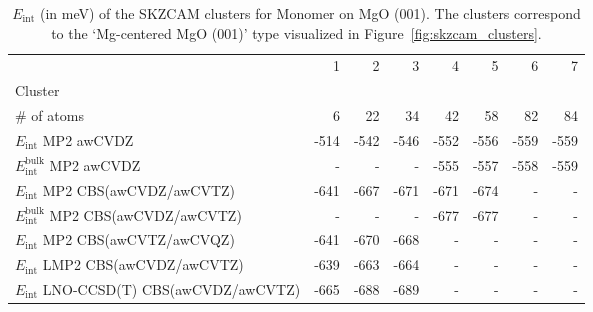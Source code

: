 \begin{table}
\caption{\label{tab:system_eint_mgo_h2o_monomer}$E_\textrm{int}$ (in meV) of the SKZCAM clusters for Monomer  on MgO (001). The clusters correspond to the `Mg-centered MgO (001)' type visualized in Figure~\ref{fig:skzcam_clusters}.}
\begin{adjustbox}{center,max width=1.4\textwidth}
\begin{tabular}{lrrrrrrr}
\toprule
 & 1 & 2 & 3 & 4 & 5 & 6 & 7 \\ 
Cluster &  &  &  &  &  &  &  \\
\midrule
\# of atoms & 6 & 22 & 34 & 42 & 58 & 82 & 84 \\
$E_\textrm{int}$ MP2 awCVDZ & -514 & -542 & -546 & -552 & -556 & -559 & -559 \\
$E_\textrm{int}^\textrm{bulk}$ MP2 awCVDZ & - & - & - & -555 & -557 & -558 & -559 \\
$E_\textrm{int}$ MP2 CBS(awCVDZ/awCVTZ) & -641 & -667 & -671 & -671 & -674 & - & - \\
$E_\textrm{int}^\textrm{bulk}$ MP2 CBS(awCVDZ/awCVTZ) & - & - & - & -677 & -677 & - & - \\
$E_\textrm{int}$ MP2 CBS(awCVTZ/awCVQZ) & -641 & -670 & -668 & - & - & - & - \\
$E_\textrm{int}$ LMP2 CBS(awCVDZ/awCVTZ) & -639 & -663 & -664 & - & - & - & - \\
$E_\textrm{int}$ LNO-CCSD(T) CBS(awCVDZ/awCVTZ) & -665 & -688 & -689 & - & - & - & - \\
\bottomrule
\end{tabular}
\end{adjustbox}
\end{table}

